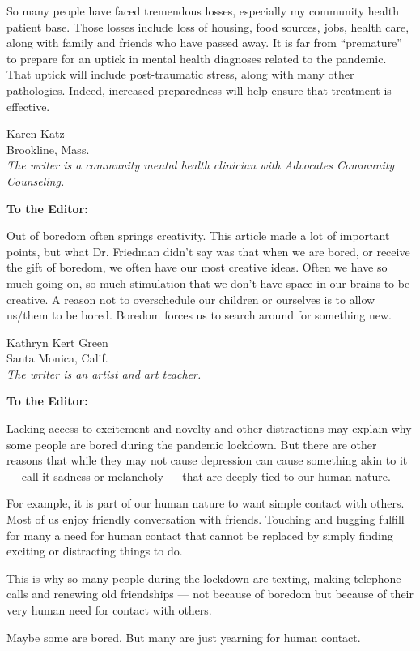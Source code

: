 So many people have faced tremendous losses, especially my community
health patient base. Those losses include loss of housing, food sources,
jobs, health care, along with family and friends who have passed away.
It is far from ``premature'' to prepare for an uptick in mental health
diagnoses related to the pandemic. That uptick will include
post-traumatic stress, along with many other pathologies. Indeed,
increased preparedness will help ensure that treatment is effective.

Karen Katz\\
Brookline, Mass.\\
\emph{The writer is a community mental health clinician with Advocates
Community Counseling.}

\textbf{To the Editor:}

Out of boredom often springs creativity. This article made a lot of
important points, but what Dr. Friedman didn't say was that when we are
bored, or receive the gift of boredom, we often have our most creative
ideas. Often we have so much going on, so much stimulation that we don't
have space in our brains to be creative. A reason not to overschedule
our children or ourselves is to allow us/them to be bored. Boredom
forces us to search around for something new.

Kathryn Kert Green\\
Santa Monica, Calif.\\
\emph{The writer is an artist and art teacher.}

\textbf{To the Editor:}

Lacking access to excitement and novelty and other distractions may
explain why some people are bored during the pandemic lockdown. But
there are other reasons that while they may not cause depression can
cause something akin to it --- call it sadness or melancholy --- that
are deeply tied to our human nature.

For example, it is part of our human nature to want simple contact with
others. Most of us enjoy friendly conversation with friends. Touching
and hugging fulfill for many a need for human contact that cannot be
replaced by simply finding exciting or distracting things to do.

This is why so many people during the lockdown are texting, making
telephone calls and renewing old friendships --- not because of boredom
but because of their very human need for contact with others.

Maybe some are bored. But many are just yearning for human contact.

